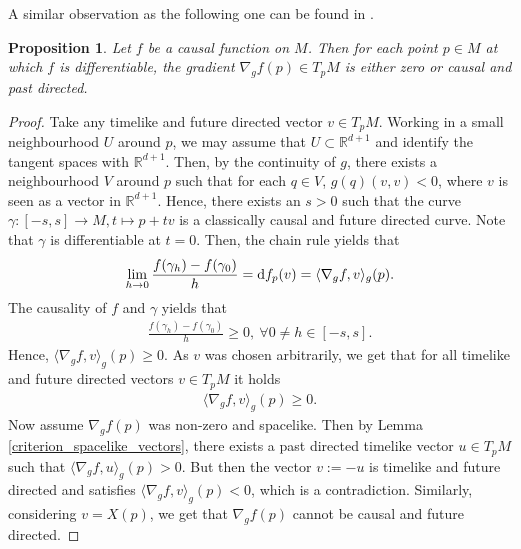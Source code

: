 \documentclass[a4paper,10pt]{article}
\newtheorem{proposition}[theorem]{Proposition}
\numberwithin{equation}{section}
\newcommand{\R}{\mathbb{R}}
\newcommand{\di}{{\rm d}}
\begin{document}
A similar observation as the following one can be found in \cite{beran2024nonlinear}.
\smallskip 

\begin{proposition}\label{causal_function_gradient}
    Let $f$ be a causal function on $M$. Then for each point $p \in M$ at which $f$ is differentiable, the gradient $\nabla_g f(p) \in T_pM$ is either zero or causal and past directed.
\end{proposition}
\begin{proof}
    Take any timelike and future directed vector $v \in T_pM$. Working in a small neighbourhood $U$ around $p$, we may assume that  $U \subset \R^{d+1}$ and identify the tangent spaces with $\R^{d+1}$. 
    Then, by the continuity of $g$, there exists a neighbourhood $V$ around $p$ such that for each $q \in V$, $g(q)(v,v) <0$, where $v$ is seen as a vector in $\R^{d+1}$. Hence, there exists an $s >0$ such that the curve $\gamma: [-s, s] \to M, t \mapsto p+ t v$ is a classically causal and future directed curve.
    Note that $\gamma$ is differentiable at $t=0$. 
    Then, the chain rule yields that 
    \begin{align*}
        \lim_{h\to 0} \frac{f(\gamma_{h})-f(\gamma_0)}{h} = \di f_p(v) = \langle \nabla_g f, v\rangle_g(p).
    \end{align*}
    The causality of $f$ and $\gamma$ yields that 
    \begin{align*}
        \frac{f(\gamma_{h})-f(\gamma_0)}{h} \geq 0,\  \forall 0\neq h \in [-s, s].
    \end{align*}
    Hence, $\langle \nabla_g f, v\rangle_g(p) \geq 0$. As $v$ was chosen arbitrarily, we get that for all timelike and future directed vectors $v \in T_pM$ it holds
    \begin{align*}
        \langle \nabla_g f, v\rangle_g (p) \geq 0.
    \end{align*}
    Now assume $\nabla_g f(p)$ was non-zero and spacelike. Then by Lemma \ref{criterion_spacelike_vectors}, there exists a past directed timelike vector $u \in T_pM$ such that $\langle \nabla_g f, u\rangle_g (p)>0$. But then the vector $v := -u$ is timelike and future directed and satisfies $\langle \nabla_g f, v\rangle_g (p) < 0$, which is a contradiction. Similarly, considering $v = X(p)$, we get that $\nabla_g f(p)$ cannot be causal and future directed.
\end{proof}
\smallskip
\end{document}
